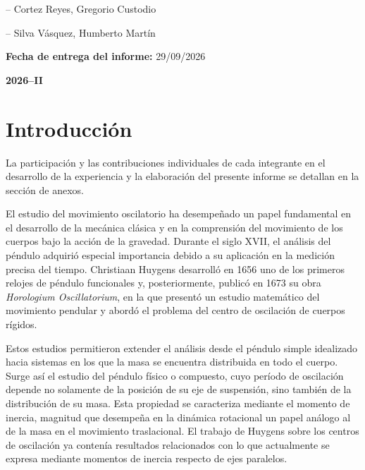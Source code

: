 \documentclass[11pt,a4paper]{article}
\begin{document}
\begin{titlepage}
{-- Cortez Reyes, Gregorio Custodio
\vspace{0.20cm}
\hspace{0.6cm}

-- Silva Vásquez, Humberto Martín
}

\vspace{0.95cm}
{\large
\textbf{Fecha de entrega del informe:}
\hspace{0.40cm}
29/09/2026
}

\vspace{1.15cm}
\begin{center}
{\huge\bfseries
2026--II}

\end{center}

\end{titlepage}

\tableofcontents

\newpage
\pagestyle{fancy}

\section{Introducción}

La participación y las contribuciones individuales de cada integrante en el desarrollo de la
experiencia y la elaboración del presente informe se detallan en la sección de anexos.

El estudio del movimiento oscilatorio ha desempeñado un papel fundamental
en el desarrollo de la mecánica clásica y en la comprensión del movimiento
de los cuerpos bajo la acción de la gravedad. Durante el siglo XVII, el
análisis del péndulo adquirió especial importancia debido a su aplicación
en la medición precisa del tiempo. Christiaan Huygens desarrolló en 1656
uno de los primeros relojes de péndulo funcionales y, posteriormente,
publicó en 1673 su obra \textit{Horologium Oscillatorium}, en la que
presentó un estudio matemático del movimiento pendular y abordó el problema
del centro de oscilación de cuerpos rígidos.

Estos estudios permitieron extender el análisis desde el péndulo simple
idealizado hacia sistemas en los que la masa se encuentra distribuida en
todo el cuerpo. Surge así el estudio del péndulo físico o compuesto, cuyo
período de oscilación depende no solamente de la posición de su eje de
suspensión, sino también de la distribución de su masa. Esta propiedad se
caracteriza mediante el momento de inercia, magnitud que desempeña en la
dinámica rotacional un papel análogo al de la masa en el movimiento
traslacional. El trabajo de Huygens sobre los centros de oscilación ya
contenía resultados relacionados con lo que actualmente se expresa
mediante momentos de inercia respecto de ejes paralelos.
\end{document}
